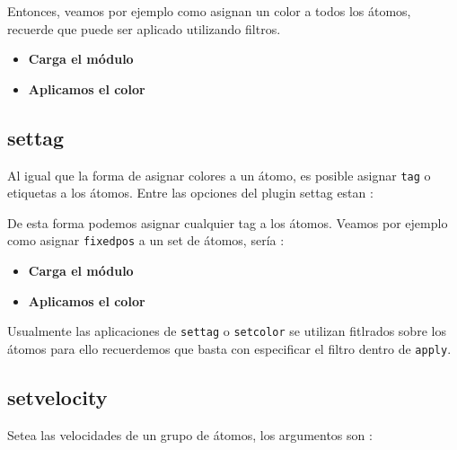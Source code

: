 
Entonces, veamos por ejemplo como asignan un color a todos los \'atomos,
recuerde que puede ser aplicado utilizando filtros.

\begin{itemize}
 \item \textbf{Carga el m\'odulo}
 \item \textbf{Aplicamos el color}
\end{itemize}

\subsection{settag}
Al igual que la forma de asignar colores a un \'atomo, es posible asignar
\verb|tag| o etiquetas a los \'atomos. Entre las opciones del plugin settag
estan :


De esta forma podemos asignar cualquier tag a los \'atomos. Veamos por ejemplo
como asignar \verb|fixedpos| a un set de \'atomos, ser\'ia :

\begin{itemize}
 \item \textbf{Carga el m\'odulo}
 \item \textbf{Aplicamos el color}
\end{itemize}

Usualmente las aplicaciones de \verb|settag| o \verb|setcolor| se utilizan
fitlrados sobre los \'atomos para ello recuerdemos que basta con especificar el
filtro dentro de \verb|apply|.

\subsection{setvelocity}
Setea las velocidades de un grupo de \'atomos, los argumentos son :

